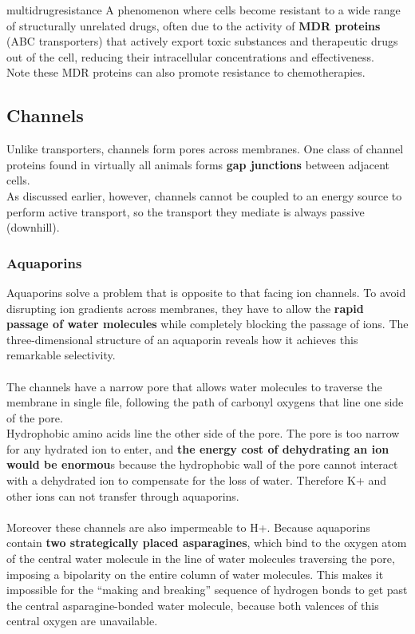 \documentclass[../main.tex]{subfiles}
\begin{document}
\begin{RemarkWithTitel}{\gls{multidrugresistance}}
	A phenomenon where cells become resistant to a wide range of structurally unrelated drugs, often due to the activity of \textbf{MDR proteins} (ABC transporters) that actively export toxic substances and therapeutic drugs out of the cell, reducing their intracellular concentrations and effectiveness.\\
	Note these MDR proteins can also promote resistance to chemotherapies. 
\end{RemarkWithTitel}

\subsection{Channels} 
Unlike transporters, channels form pores across membranes. One class of channel proteins found in virtually all animals forms \textbf{gap junctions} between adjacent cells.\\
As discussed earlier, however, channels cannot be coupled to an energy source to perform active transport, so the transport they mediate is always passive (downhill).

\subsubsection{Aquaporins}
Aquaporins solve a problem that is opposite to that facing ion channels. To avoid disrupting ion gradients across membranes, they have to allow the \textbf{rapid passage of water molecules} while completely blocking the passage of ions. The three-dimensional structure of an aquaporin reveals how it achieves this remarkable selectivity. \\
\\
The channels have a narrow pore that allows water molecules to traverse the membrane in single file, following the path of carbonyl oxygens that line one side of the pore. \\
Hydrophobic amino acids line the other side of the pore. The pore is too narrow for any hydrated ion to enter, and \textbf{the energy cost of dehydrating an ion would be enormou}s because the hydrophobic wall of the pore cannot interact with a dehydrated ion to compensate for the loss of water. Therefore K+ and other ions can not transfer through aquaporins. \\
\\
Moreover these channels are also impermeable to H+. Because aquaporins contain \textbf{two strategically placed asparagines}, which bind to the oxygen atom of the central water molecule in the line of water molecules traversing the pore, imposing a bipolarity on the entire column of water molecules. This makes it impossible for the “making and breaking” sequence of hydrogen bonds to get past the central asparagine-bonded water molecule, because both valences of this central oxygen are unavailable. 
\end{document}
